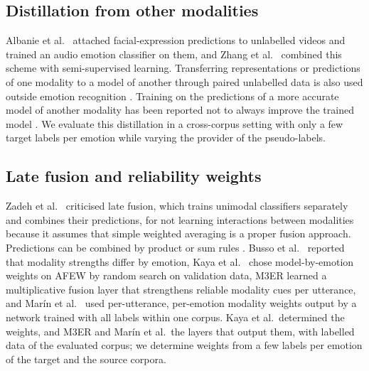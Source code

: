 \subsection{Distillation from other modalities}\label{sec:rel-distill}
Albanie et al.\ \cite{albanie2018} attached facial-expression predictions to unlabelled videos and trained an audio emotion classifier on them, and Zhang et al.\ \cite{zhang2021combining} combined this scheme with semi-supervised learning. Transferring representations or predictions of one modality to a model of another through paired unlabelled data is also used outside emotion recognition \cite{gupta2016,jaritz2020xmuda}. Training on the predictions of a more accurate model of another modality has been reported not to always improve the trained model \cite{xue2023mfh}. We evaluate this distillation in a cross-corpus setting with only a few target labels per emotion while varying the provider of the pseudo-labels.

\subsection{Late fusion and reliability weights}\label{sec:rel-fusion}
Zadeh et al.\ \cite{zadeh2017tfn} criticised late fusion, which trains unimodal classifiers separately and combines their predictions, for not learning interactions between modalities because it assumes that simple weighted averaging is a proper fusion approach. Predictions can be combined by product or sum rules \cite{kittler1998}. Busso et al.\ \cite{busso2004} reported that modality strengths differ by emotion, Kaya et al.\ \cite{kaya2017} chose model-by-emotion weights on AFEW by random search on validation data, M3ER \cite{mittal2020m3er} learned a multiplicative fusion layer that strengthens reliable modality cues per utterance, and Mar\'in et al.\ \cite{marin2026classwise} used per-utterance, per-emotion modality weights output by a network trained with all labels within one corpus. Kaya et al.\ determined the weights, and M3ER and Mar\'in et al.\ the layers that output them, with labelled data of the evaluated corpus; we determine weights from a few labels per emotion of the target and the source corpora.

